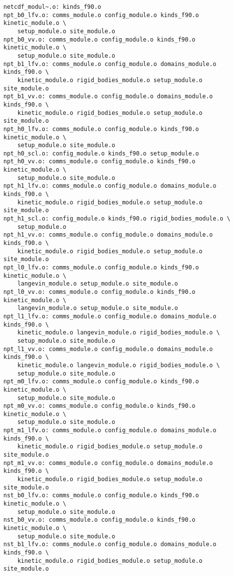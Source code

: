 \begin{verbatim}
netcdf_modul~.o: kinds_f90.o
npt_b0_lfv.o: comms_module.o config_module.o kinds_f90.o kinetic_module.o \
	setup_module.o site_module.o
npt_b0_vv.o: comms_module.o config_module.o kinds_f90.o kinetic_module.o \
	setup_module.o site_module.o
npt_b1_lfv.o: comms_module.o config_module.o domains_module.o kinds_f90.o \
	kinetic_module.o rigid_bodies_module.o setup_module.o site_module.o
npt_b1_vv.o: comms_module.o config_module.o domains_module.o kinds_f90.o \
	kinetic_module.o rigid_bodies_module.o setup_module.o site_module.o
npt_h0_lfv.o: comms_module.o config_module.o kinds_f90.o kinetic_module.o \
	setup_module.o site_module.o
npt_h0_scl.o: config_module.o kinds_f90.o setup_module.o
npt_h0_vv.o: comms_module.o config_module.o kinds_f90.o kinetic_module.o \
	setup_module.o site_module.o
npt_h1_lfv.o: comms_module.o config_module.o domains_module.o kinds_f90.o \
	kinetic_module.o rigid_bodies_module.o setup_module.o site_module.o
npt_h1_scl.o: config_module.o kinds_f90.o rigid_bodies_module.o \
	setup_module.o
npt_h1_vv.o: comms_module.o config_module.o domains_module.o kinds_f90.o \
	kinetic_module.o rigid_bodies_module.o setup_module.o site_module.o
npt_l0_lfv.o: comms_module.o config_module.o kinds_f90.o kinetic_module.o \
	langevin_module.o setup_module.o site_module.o
npt_l0_vv.o: comms_module.o config_module.o kinds_f90.o kinetic_module.o \
	langevin_module.o setup_module.o site_module.o
npt_l1_lfv.o: comms_module.o config_module.o domains_module.o kinds_f90.o \
	kinetic_module.o langevin_module.o rigid_bodies_module.o \
	setup_module.o site_module.o
npt_l1_vv.o: comms_module.o config_module.o domains_module.o kinds_f90.o \
	kinetic_module.o langevin_module.o rigid_bodies_module.o \
	setup_module.o site_module.o
npt_m0_lfv.o: comms_module.o config_module.o kinds_f90.o kinetic_module.o \
	setup_module.o site_module.o
npt_m0_vv.o: comms_module.o config_module.o kinds_f90.o kinetic_module.o \
	setup_module.o site_module.o
npt_m1_lfv.o: comms_module.o config_module.o domains_module.o kinds_f90.o \
	kinetic_module.o rigid_bodies_module.o setup_module.o site_module.o
npt_m1_vv.o: comms_module.o config_module.o domains_module.o kinds_f90.o \
	kinetic_module.o rigid_bodies_module.o setup_module.o site_module.o
nst_b0_lfv.o: comms_module.o config_module.o kinds_f90.o kinetic_module.o \
	setup_module.o site_module.o
nst_b0_vv.o: comms_module.o config_module.o kinds_f90.o kinetic_module.o \
	setup_module.o site_module.o
nst_b1_lfv.o: comms_module.o config_module.o domains_module.o kinds_f90.o \
	kinetic_module.o rigid_bodies_module.o setup_module.o site_module.o

\end{verbatim}

